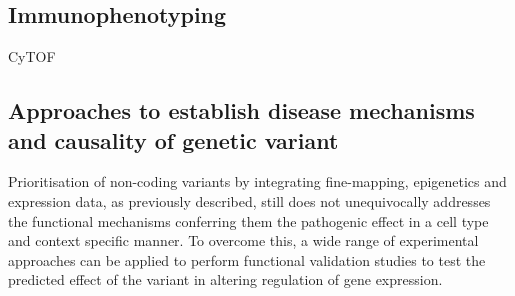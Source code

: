 
\subsection{Immunophenotyping}
CyTOF

\subsection{Approaches to establish disease mechanisms and causality of genetic variant}
Prioritisation of non-coding variants by integrating fine-mapping, epigenetics and expression data, as previously described, still does not unequivocally addresses the functional mechanisms conferring them the pathogenic effect in a cell type and context specific manner. To overcome this, a wide range of experimental approaches can be applied to perform functional validation studies to test the predicted effect of the variant in altering regulation of gene expression. 
